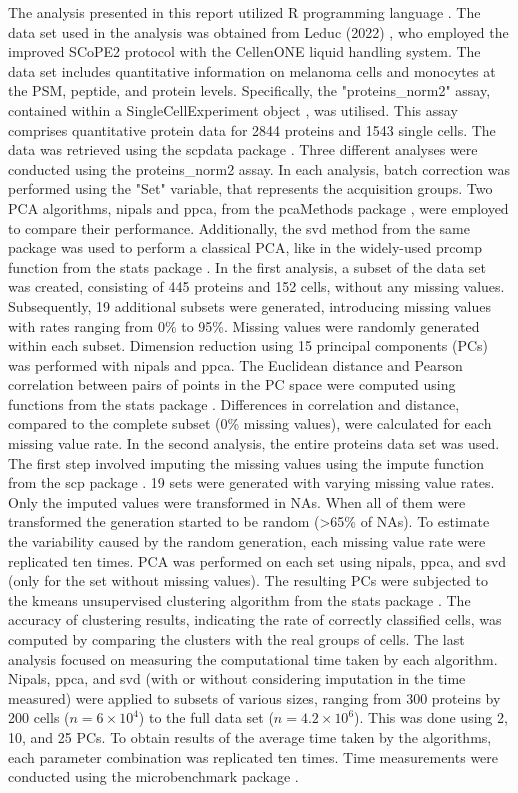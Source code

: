 \documentclass[a4paper, 11pt, twocolumn]{article}
\begin{document}
The analysis presented in this report utilized R programming language \citep{Rlang}. The data set used in the analysis was obtained from Leduc (2022) \citep{Leduc2022}, who employed the improved SCoPE2 protocol with the CellenONE liquid handling system. The data set includes quantitative information on melanoma cells and monocytes at the PSM, peptide, and protein levels. Specifically, the "proteins\_norm2" assay, contained within a SingleCellExperiment object \citep{SingleCellExperiment}, was utilised. This assay comprises quantitative protein data for 2844 proteins and 1543 single cells. The data was retrieved using the scpdata package \citep{scpdata}.
Three different analyses were conducted using the proteins\_norm2 assay. In each analysis, batch correction was performed using the "Set" variable, that represents the acquisition groups. Two PCA algorithms, nipals and ppca, from the pcaMethods package \citep{pcaMethods}, were employed to compare their performance. Additionally, the svd method from the same package was used to perform a classical PCA, like in the widely-used prcomp function from the stats package \citep{Rlang}.
In the first analysis, a subset of the data set was created, consisting of 445 proteins and 152 cells, without any missing values. Subsequently, 19 additional subsets were generated, introducing missing values with rates ranging from 0\% to 95\%. Missing values were randomly generated within each subset. Dimension reduction using 15 principal components (PCs) was performed with nipals and ppca. The Euclidean distance and Pearson correlation between pairs of points in the PC space were computed using functions from the stats package \citep{Rlang}. Differences in correlation and distance, compared to the complete subset (0\% missing values), were calculated for each missing value rate.
In the second analysis, the entire proteins data set was used. The first step involved imputing the missing values using the impute function from the scp package \citep{scp}. 19 sets were generated with varying missing value rates. Only the imputed values were transformed in NAs. When all of them were transformed the generation started to be random (>65\% of NAs). To estimate the variability caused by the random generation, each missing value rate were replicated ten times. PCA was performed on each set using nipals, ppca, and svd (only for the set without missing values). The resulting PCs were subjected to the kmeans unsupervised clustering algorithm from the stats package \citep{Rlang}. The accuracy of clustering results, indicating the rate of correctly classified cells, was computed by comparing the clusters with the real groups of cells.
The last analysis focused on measuring the computational time taken by each algorithm. Nipals, ppca, and svd (with or without considering imputation in the time measured) were applied to subsets of various sizes, ranging from 300 proteins by 200 cells ($n = 6 \times 10^4$) to the full data set ($n = 4.2 \times 10^6$). This was done using 2, 10, and 25 PCs. To obtain results of the average time taken by the algorithms, each parameter combination was replicated ten times. Time measurements were conducted using the microbenchmark package \citep{microbenchmark}. 
\end{document}
